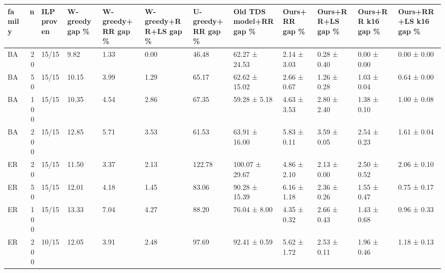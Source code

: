 \begin{tabular}{lrllllllllll}
\toprule
family & n & ILP proven & W-greedy gap \% & W-greedy+RR gap \% & W-greedy+RR+LS gap \% & U-greedy+RR gap \% & Old TDS model+RR gap \% & Ours+RR gap \% & Ours+RR+LS gap \% & Ours+RR k16 gap \% & Ours+RR+LS k16 gap \% \\
\midrule
BA & 20 & 15/15 & 9.82 & 1.33 & 0.00 & 46.48 & 62.27 ± 24.53 & 2.14 ± 3.03 & 0.28 ± 0.40 & 0.00 ± 0.00 & 0.00 ± 0.00 \\
BA & 50 & 15/15 & 10.15 & 3.99 & 1.29 & 65.17 & 62.62 ± 15.02 & 2.66 ± 0.67 & 1.26 ± 0.28 & 1.03 ± 0.04 & 0.64 ± 0.00 \\
BA & 100 & 15/15 & 10.35 & 4.54 & 2.86 & 67.35 & 59.28 ± 5.18 & 4.63 ± 3.53 & 2.80 ± 2.40 & 1.38 ± 0.10 & 1.00 ± 0.08 \\
BA & 200 & 15/15 & 12.85 & 5.71 & 3.53 & 61.53 & 63.91 ± 16.00 & 5.83 ± 0.11 & 3.59 ± 0.05 & 2.54 ± 0.23 & 1.61 ± 0.04 \\
ER & 20 & 15/15 & 11.50 & 3.37 & 2.13 & 122.78 & 100.07 ± 29.67 & 4.86 ± 2.10 & 2.13 ± 0.00 & 2.50 ± 0.52 & 2.06 ± 0.10 \\
ER & 50 & 15/15 & 12.01 & 4.18 & 1.45 & 83.06 & 90.28 ± 15.39 & 6.16 ± 1.18 & 2.36 ± 0.26 & 1.55 ± 0.47 & 0.75 ± 0.17 \\
ER & 100 & 15/15 & 13.33 & 7.04 & 4.27 & 88.20 & 76.04 ± 8.00 & 4.35 ± 0.32 & 2.66 ± 0.43 & 1.43 ± 0.68 & 0.96 ± 0.33 \\
ER & 200 & 10/15 & 12.05 & 3.91 & 2.48 & 97.69 & 92.41 ± 0.59 & 5.62 ± 1.72 & 2.53 ± 0.11 & 1.96 ± 0.46 & 1.18 ± 0.13 \\
\bottomrule
\end{tabular}
